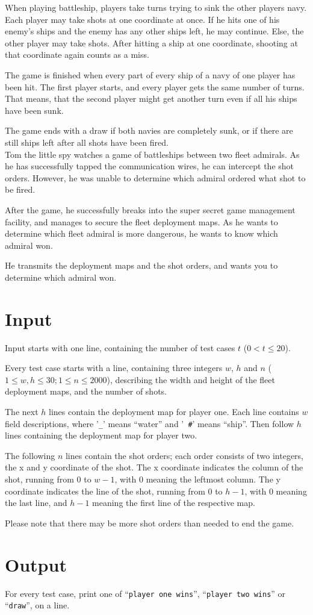 
When playing battleship, players take turns trying to sink the other
players navy. Each player may take shots at one coordinate at once. If
he hits one of his enemy's ships and the enemy has any other ships
left, he may continue. Else, the other player may take shots. After
hitting a ship at one coordinate, shooting at that coordinate again
counts as a miss.

The game is finished when every part of every ship of a navy of one
player has been hit. The first player starts, and every player gets
the same number of turns. That means, that the second player might get
another turn even if all his ships have been sunk.

The game ends with a draw if both navies are completely sunk, or if
there are still ships left after all shots have been fired.\\

Tom the little spy watches a game of battleships between two fleet
admirals. As he has successfully tapped the communication wires, he
can intercept the shot orders. However, he was unable to determine
which admiral ordered what shot to be fired.

After the game, he successfully breaks into the super secret game
management facility, and manages to secure the fleet deployment
maps. As he wants to determine which fleet admiral is more dangerous,
he wants to know which admiral won. 

He transmits the deployment maps and the shot orders, and wants you to
determine which admiral won.

\section*{Input}
Input starts with one line, containing the number of test cases $t$ ($0 < t \le 20$).

Every test case starts with a line, containing three integers $w$, $h$ and
$n$ ($1 \le w, h \leq 30; 1 \le n \leq 2000$), describing the width and height of the
fleet deployment maps, and the number of shots.

The next $h$ lines contain the deployment map for player one. Each line
contains $w$ field descriptions, where '{\tt \_}' means ``water'' and '{\tt
\#}' means ``ship''. Then follow $h$ lines containing the deployment map for
player two.

The following $n$ lines contain the shot orders; each order consists
of two integers, the x and y coordinate of the shot. The x coordinate
indicates the column of the shot, running from $0$ to $w-1$, with $0$
meaning the leftmost column. The y coordinate indicates the line of
the shot, running from $0$ to $h-1$, with $0$ meaning the last line,
and $h-1$ meaning the first line of the respective map.

Please note that there may be more shot orders than needed to end the
game.

\section*{Output}
For every test case, print one of ``{\tt player one wins}'', ``{\tt player
two wins}'' or ``{\tt draw}'', on a line.

